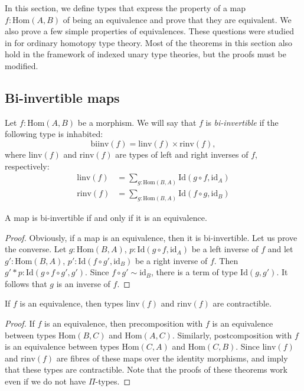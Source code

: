 \documentclass[reqno]{amsart}
\theoremstyle{definition}
\theoremstyle{remark}
\newcommand{\fs}[1]{\mathrm{#1}}
\newcommand{\Hom}{\fs{Hom}}
\newcommand{\Id}{\fs{Id}}
\newcommand{\id}{\fs{id}}
\numberwithin{figure}{section}
\begin{document}
In this section, we define types that express the property of a map $f : \Hom(A,B)$ of being an equivalence and prove that they are equivalent.
We also prove a few simple properties of equivalences.
These questions were studied in \cite[Section~4]{hottbook} for ordinary homotopy type theory.
Most of the theorems in this section also hold in the framework of indexed unary type theories, but the proofs must be modified.

\subsection{Bi-invertible maps}

Let $f : \Hom(A,B)$ be a morphism.
We will say that $f$ is \emph{bi-invertible} if the following type is inhabited:
\[ \fs{biinv}(f) = \fs{linv}(f) \times \fs{rinv}(f), \]
where $\fs{linv}(f)$ and $\fs{rinv}(f)$ are types of left and right inverses of $f$, respectively:
\begin{align*}
\fs{linv}(f) & = \sum_{g : \Hom(B,A)} \Id(g \circ f, \id_A) \\
\fs{rinv}(f) & = \sum_{g : \Hom(B,A)} \Id(f \circ g, \id_B)
\end{align*}

\begin{prop}
A map is bi-invertible if and only if it is an equivalence.
\end{prop}
\begin{proof}
Obviously, if a map is an equivalence, then it is bi-invertible.
Let us prove the converse.
Let $g : \Hom(B,A)$, $p : \Id(g \circ f, \id_A)$ be a left inverse of $f$ and let $g' : \Hom(B,A)$, $p' : \Id(f \circ g', \id_B)$ be a right inverse of $f$.
Then $g' * p : \Id(g \circ f \circ g', g')$.
Since $f \circ g' \sim \id_B$, there is a term of type $\Id(g,g')$.
It follows that $g$ is an inverse of $f$.
\end{proof}

\begin{lem}
If $f$ is an equivalence, then types $\fs{linv}(f)$ and $\fs{rinv}(f)$ are contractible.
\end{lem}
\begin{proof}
If $f$ is an equivalence, then precomposition with $f$ is an equivalence between types $\Hom(B,C)$ and $\Hom(A,C)$.
Similarly, postcomposition with $f$ is an equivalence between types $\Hom(C,A)$ and $\Hom(C,B)$.
Since $\fs{linv}(f)$ and $\fs{rinv}(f)$ are fibres of these maps over the identity morphisms, \cite[Theorem~4.2.3]{hottbook} and \cite[Theorem~4.2.6]{hottbook} imply that these types are contractible.
Note that the proofs of these theorems work even if we do not have $\Pi$-types.
\end{proof}
\end{document}
